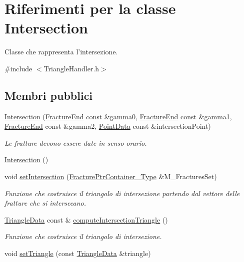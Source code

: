 \hypertarget{classIntersection}{\section{Riferimenti per la classe Intersection}
\label{classIntersection}
}


Classe che rappresenta l'intersezione.  




{\ttfamily \#include $<$Triangle\-Handler.\-h$>$}

\subsection*{Membri pubblici}
\begin{DoxyCompactItemize}
\item 
\hyperlink{classIntersection_ad0bef2cc1bd1f80e72e4b265e19225ca}{Intersection} (\hyperlink{classFractureEnd}{Fracture\-End} const \&gamma0, \hyperlink{classFractureEnd}{Fracture\-End} const \&gamma1, \hyperlink{classFractureEnd}{Fracture\-End} const \&gamma2, \hyperlink{classPointData}{Point\-Data} const \&intersection\-Point)
\begin{DoxyCompactList}\small\item\em Le fratture devono essere date in senso orario. \end{DoxyCompactList}\item 
\hyperlink{classIntersection_a67497e3efe2793b23909052eeb82c4f3}{Intersection} ()
\item 
void \hyperlink{classIntersection_ab7a139ac5712a9aa8bb925caf4ecc8af}{set\-Intersection} (\hyperlink{FractureHandler_8h_a2f0b57e18ecf89912d7de0c87158009e}{Fracture\-Ptr\-Container\-\_\-\-Type} \&M\-\_\-\-Fractures\-Set)
\begin{DoxyCompactList}\small\item\em Funzione che costruisce il triangolo di intersezione partendo dal vettore delle fratture che si intersecano. \end{DoxyCompactList}\item 
\hyperlink{classTriangleData}{Triangle\-Data} const \& \hyperlink{classIntersection_ae9d2fb8951a9f5a2bd7c1a96d73226f4}{compute\-Intersection\-Triangle} ()
\begin{DoxyCompactList}\small\item\em Funzione che costruisce il triangolo di intersezione. \end{DoxyCompactList}\item 
void \hyperlink{classIntersection_ae071ecb3d3f2d6f9723e310764535883}{set\-Triangle} (const \hyperlink{classTriangleData}{Triangle\-Data} \&triangle)

\end{DoxyCompactItemize}
